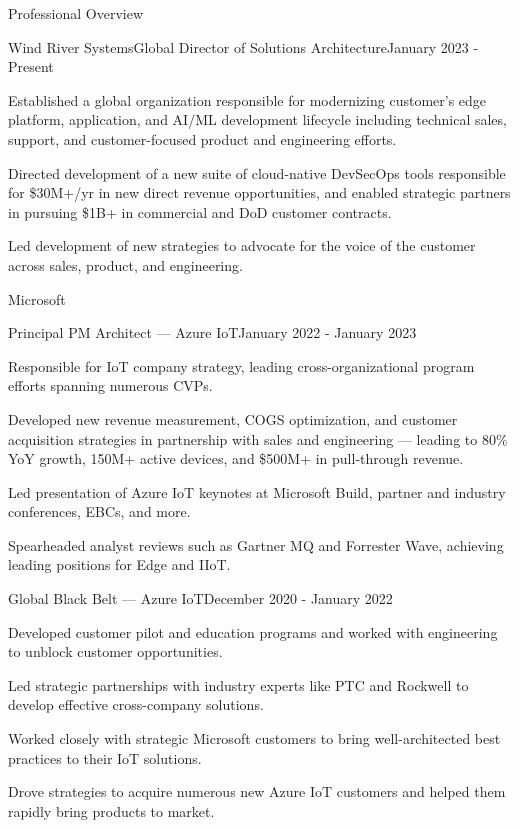 \documentclass{resume} %
\begin{document}
\begin{rSection}{Professional Overview}
  
  \begin{rNewRole}{Wind River Systems}{Global Director of Solutions Architecture}{January 2023 - Present}
    \item Established a global organization responsible for modernizing customer's edge platform, application, and AI/ML development lifecycle including technical sales, support, and customer-focused product and engineering efforts.
    \item Directed development of a new suite of cloud-native DevSecOps tools responsible for \$30M+/yr in new direct revenue opportunities, and enabled strategic partners in pursuing \$1B+ in commercial and DoD customer contracts.
    \item Led development of new strategies to advocate for the voice of the customer across sales, product, and engineering.
  \end{rNewRole}

  \begin{rCompany}{Microsoft}{}{}

    \begin{rSubSubsection}{Principal PM Architect --- Azure IoT}{January 2022 - January 2023}
        
      \item Responsible for IoT company strategy, leading cross-organizational program efforts spanning numerous CVPs.
      \item Developed new revenue measurement, COGS optimization, and customer acquisition strategies in partnership with sales and engineering --- leading to 80\% YoY growth, 150M+ active devices, and \$500M+ in pull-through revenue.
      \item Led presentation of Azure IoT keynotes at Microsoft Build, partner and industry conferences, EBCs, and more.
      \item Spearheaded analyst reviews such as Gartner MQ and Forrester Wave, achieving leading positions for Edge and IIoT.
      
    \end{rSubSubsection}

    \begin{rSubSubsection}{Global Black Belt --- Azure IoT}{December 2020 - January 2022}
        
      \item Developed customer pilot and education programs and worked with engineering to unblock customer opportunities.
      \item Led strategic partnerships with industry experts like PTC and Rockwell to develop effective cross-company solutions.
      \item Worked closely with strategic Microsoft customers to bring well-architected best practices to their IoT solutions.
      \item Drove strategies to acquire numerous new Azure IoT customers and helped them rapidly bring products to market.
      

\end{rSubSubsection}
\end{rCompany}
\end{rSection}
\end{document}
